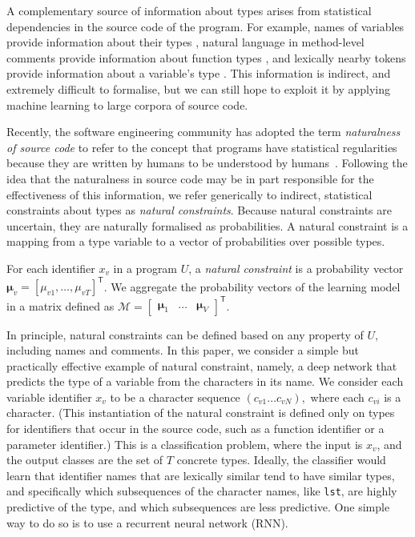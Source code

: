 \documentclass[acmsmall, review, anonymous]{acmart}\settopmatter{printfolios=true,printccs=false,printacmref=false}
\begin{document}
A complementary source of information about types arises from statistical dependencies
in the source code of the program.  For example, names of variables provide
information about their types \cite{xu16}, natural language in
method-level comments provide information about function types \cite{malik19},
and lexically nearby tokens provide information
about a variable's type \cite{hellendoorn18}.
This information is indirect, and extremely difficult to formalise,
but we can still hope to exploit it by applying machine learning
to large corpora of source code.

Recently, the software engineering
community has adopted the term \emph{naturalness of source code} to refer to
the concept that programs have statistical regularities because
they are written by humans to be
understood by humans~\citep{hindle12}.
Following the idea that the naturalness in source code may be in part responsible
for the effectiveness of this information, we
refer generically to indirect, statistical
constraints about types as \emph{natural constraints}.
Because natural constraints are uncertain, they are naturally formalised
as probabilities.
A natural constraint is a mapping from a type variable to a vector
of probabilities
over possible types.
\begin{definition}\label{eq:natural}
	For each identifier $x_v$ in a program $U$,
	a \emph{natural constraint} is a probability vector $\bm{\mu}_v = [\mu_{v1}, \ldots, \mu_{vT}]^\mathsf{T}$.
	We aggregate the probability vectors of the learning model in a matrix
	defined as $\mathcal{M} = \begin{bmatrix} \bm{\mu}_1 & \ldots & \bm{\mu}_{V} \end{bmatrix}^\mathsf{T}$.
\end{definition}

In principle, natural constraints can be defined based on any property of $U,$
including names and comments.
In this paper, we consider a simple but practically effective example of
natural constraint, namely, a deep network that predicts the type
of a variable from the characters in its name.
We consider each variable identifier $x_v$ to be a character sequence $(c_{v1} \ldots c_{vN}),$
where each $c_{vi}$ is a character.
(This instantiation of the natural constraint is defined
only on types for identifiers that occur in the source code,
such as a function identifier or a parameter identifier.)
This is a classification problem, where the input is $x_v$,
and the output classes are the set of $T$ concrete types.
Ideally, the classifier would learn that identifier names that are lexically similar
tend to have similar types, and specifically which subsequences of the character names,
like \texttt{lst}, are highly predictive of the type, and which subsequences are less predictive.
One simple way to do so is to use a recurrent neural network (RNN).
\end{document}
